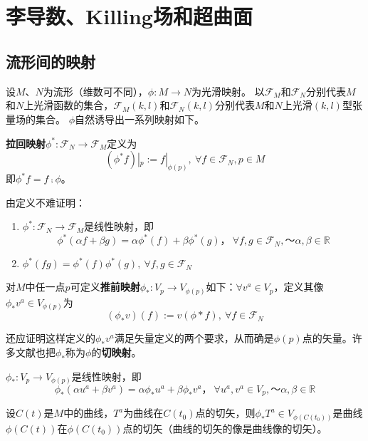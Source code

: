 \chapter[李导数、Killing场和超曲面]{\\李导数、Killing场和超曲面}

\section{流形间的映射}

设$M$、$N$为流形（维数可不同），$\phi \colon M \to N$为光滑映射。
以$\mathscr{F}_M$和$\mathscr{F}_N$分别代表$M$和$N$上光滑函数的集合，$\mathscr{F}_M(k, l)$和$\mathscr{F}_N(k, l)$分别代表$M$和$N$上光滑$(k,l)$型张量场的集合。
$\phi$自然诱导出一系列映射如下。

\begin{definition}
	\textbf{拉回映射}$\phi^* \colon \mathscr{F}_N \to \mathscr{F}_M$定义为
	$$(\phi^*f)|_p := f|_{\phi(p)}, ~ \forall f \in \mathscr{F}_N, p \in M$$
	即$\phi^*f = f \comp \phi$。
\end{definition}

由定义不难证明：
\begin{enumerate}[（1）]
	\item $\phi^* \colon \mathscr{F}_N \to \mathscr{F}_M$是线性映射，即
	      $$\phi^*(\alpha f + \beta g) = \alpha\phi^*(f) + \beta\phi^*(g)， ~ \forall f,g \in \mathscr{F}_N, ～ \alpha,\beta \in \mathbb{R}$$
	\item $\phi^*(fg) = \phi^*(f)\phi^*(g), ~ \forall f,g \in \mathscr{F}_N$
\end{enumerate}

\begin{definition}
	对$M$中任一点$p$可定义\textbf{推前映射}$\phi_* \colon V_p \to V_{\phi(p)}$如下：$\forall v^a \in V_p$，定义其像$\phi_*v^a \in V_{\phi(p)}$为
	$$(\phi_*v)(f) := v(\phi*f), ~ \forall f \in \mathscr{F}_N$$
\end{definition}

还应证明这样定义的$\phi_*v^a$满足矢量定义的两个要求，从而确是$\phi(p)$点的矢量。许多文献也把$\phi_*$称为$\phi$的\textbf{切映射}。

\begin{theorem}
	$\phi_* \colon V_p \to V_{\phi(p)}$是线性映射，即
	$$\phi_*(\alpha u^a + \beta v^a) = \alpha\phi_*u^a + \beta\phi_*v^a， ~ \forall u^a,v^a \in V_p, ～ \alpha,\beta \in \mathbb{R}$$
\end{theorem}

\begin{theorem}
	设$C(t)$是$M$中的曲线，$T^a$为曲线在$C(t_0)$点的切矢，则$\phi_*T^a \in V_{\phi(C(t_0))}$是曲线$\phi(C(t))$在$\phi(C(t_0))$点的切矢（曲线的切矢的像是曲线像的切矢）。
\end{theorem}

